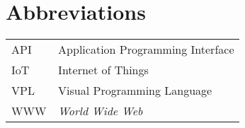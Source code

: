\chapter*{Abbreviations}


\begin{flushleft}
\begin{tabular}{l p{0.8\linewidth}}
API      & Application Programming Interface\\
IoT      & Internet of Things\\
VPL      & Visual Programming Language\\
WWW      & \emph{World Wide Web}
\end{tabular}
\end{flushleft}

